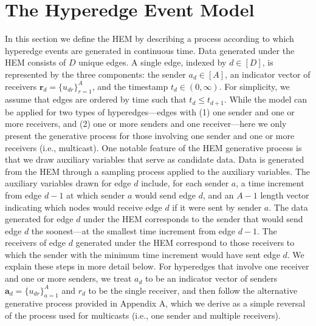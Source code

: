 \documentclass[ba]{imsart}
\numberwithin{equation}{section}
\theoremstyle{plain}
\begin{document}
\section{The Hyperedge Event Model}\label{sec:generative process}

In this section we define the HEM by describing a process according to which hyperedge events are generated in continuous time. Data generated under the HEM consists of $D$ unique edges. A single edge, indexed by $d \in [D]$, is represented by the three components: the sender $a_d \in [A]$, an indicator vector of receivers $\boldsymbol{r}_d = \{u_{dr} \}_{r=1}^{A}$, and the timestamp $t_d \in (0, \infty)$. For simplicity, we assume that edges are ordered by time such that $t_d \leq t_{d+1}$. While the model can be applied for two types of hyperedges---edges with (1) one sender and one or more receivers, and (2) one or more senders and one receiver---here we only present the generative process for those involving one sender and one or more receivers (i.e., multicast). One notable feature of the HEM generative process is that we draw auxiliary variables that serve as candidate data. Data is generated from the HEM through a sampling process applied to the auxiliary variables. The auxiliary variables drawn for edge $d$ include, for each sender $a$, a time increment from edge $d-1$ at which sender $a$ would send edge $d$, and an $A-1$ length vector indicating which nodes would receive edge $d$ if it were sent by sender $a$.  The data generated for edge $d$ under the HEM corresponds to the sender that would send edge $d$ the soonest---at the smallest time increment from edge $d-1$. The receivers of edge $d$ generated under the HEM correspond to those receivers to which the sender with the minimum time increment would have sent edge $d$. We explain these steps in more detail below. For hyperedges that involve one receiver and one or more senders, we treat $a_d$ to be an indicator vector of senders $\boldsymbol{a}_d = \{u_{dr} \}_{a=1}^{A}$ and $r_d$ to be the single receiver, and then follow the alternative generative process provided in Appendix A, which we derive as a simple reversal of the process used for multicasts (i.e., one sender and multiple receivers). 
 
\end{document}
